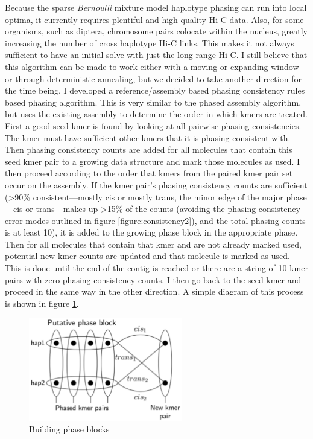 \par{
Because the sparse \textit{Bernoulli} mixture model haplotype phasing can run into local optima, it currently requires plentiful and high quality Hi-C data. Also, for some organisms, such as diptera, chromosome pairs colocate within the nucleus\cite{somaticpairing}, greatly increasing the number of cross haplotype Hi-C links. This makes it not always sufficient to have an initial solve with just the long range Hi-C. I still believe that this algorithm can be made to work either with a moving or expanding window or through deterministic annealing, but we decided to take another direction for the time being. I developed a reference/assembly based phasing consistency rules based phasing algorithm. This is very similar to the phased assembly algorithm, but uses the existing assembly to determine the order in which kmers are treated. First a good seed kmer is found by looking at all pairwise phasing consistencies. The kmer must have sufficient other kmers that it is phasing consistent with. Then phasing consistency counts are added for all molecules that contain this seed kmer pair to a growing data structure and mark those molecules as used. I then proceed according to the order that kmers from the paired kmer pair set occur on the assembly. If the kmer pair's phasing consistency counts are sufficient (>90\% consistent---mostly cis or mostly trans, the minor edge of the major phase---cis or trans---makes up >15\% of the counts (avoiding the phasing consistency error modes outlined in figure \ref{figure:consistency2}), and the total phasing counts is at least 10), it is added to the growing phase block in the appropriate phase. Then for all molecules that contain that kmer and are not already marked used, potential new kmer counts are updated and that molecule is marked as used. This is done until the end of the contig is reached or there are a string of 10 kmer pairs with zero phasing consistency counts. I then go back to the seed kmer and proceed in the same way in the other direction. A simple diagram of this process is shown in figure \ref{figure:phaseblocks}.
}

\begin{figure}[htbp!]
\caption{Building phase blocks}
\label{figure:phaseblocks}
\begin{centering}
\includegraphics[width=0.6\textwidth]{phaseblockbuilding.png}
\end{centering}

\end{figure}


